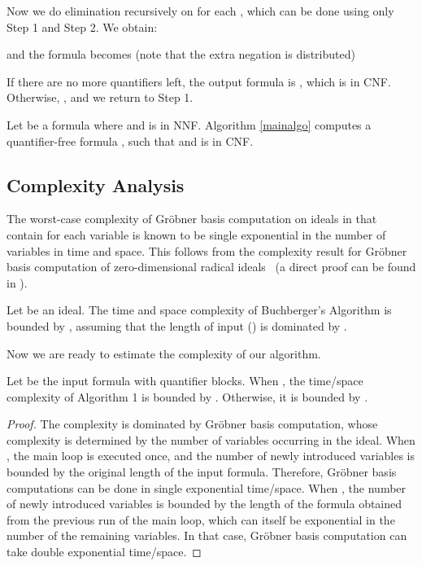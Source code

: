 \documentclass[envcountsect]{llncs}
\begin{document}
{}Now we do elimination recursively on  for each , which can be done using only Step 1 and Step 2. We obtain:{

and the formula becomes (note that the extra negation is distributed){

If there are no more quantifiers left, the output formula is , which is in CNF. Otherwise, , and we return to Step 1.



\begin{theorem}[Correctness]
Let  be a formula  where  and  is in NNF. Algorithm \ref{mainalgo} computes a quantifier-free formula , such that  and  is in CNF.
\end{theorem}

\subsection{Complexity Analysis}

The worst-case complexity of Gr\"obner basis computation on ideals in  that contain  for each variable  is known to be single exponential in the number of variables in time and space. This follows from the complexity result for Gr\"obner basis computation of zero-dimensional radical ideals~\cite{Lakshman} (a direct proof can be found in \cite{gao09}). 

\begin{proposition}\label{gb-time}
Let  be an ideal. The time and space complexity of Buchberger's Algorithm is bounded by , assuming that the length of input () is dominated by .
\end{proposition}

Now we are ready to estimate the complexity of our algorithm.

\begin{theorem}[Complexity]\label{complexity}
Let  be the input formula with  quantifier blocks. When , the time/space complexity of Algorithm 1 is bounded by . Otherwise, it is bounded by .
\end{theorem}
\begin{proof}
The complexity is dominated by Gr\"obner basis computation, whose complexity is determined by the number of variables occurring in the ideal. When , the main loop is executed once, and the number of newly introduced variables is bounded by the original length of the input formula. Therefore, Gr\"obner basis computations can be done in single exponential time/space. When , the number of newly introduced variables is bounded by the length of the formula obtained from the previous run of the main loop, which can itself be exponential in the number of the remaining variables.  In that case, Gr\"obner basis computation can take double exponential time/space. 


\end{proof}}}
\end{document}

